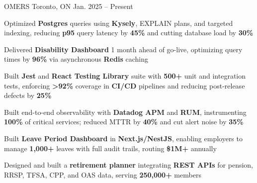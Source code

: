\documentclass[11pt, a4paper]{awesome-cv}
\begin{document}
\makecvheader[C]


\begin{cventries}


  \cventry
    {\color{lightblue}{ASSOCIATE FULL-STACK ENGINEER}}
    {OMERS}
    {Toronto, ON}
    {Jan. 2025 -- Present}
    {
      \begin{cvitems}
        \item{Optimized \textbf{Postgres} queries using \textbf{Kysely}, EXPLAIN plans, and targeted indexing, reducing \textbf{p95} query latency by \textbf{45\%} and cutting database load by \textbf{30\%}}
        \item{Delivered \textbf{Disability Dashboard} 1 month ahead of go-live, optimizing query times by \textbf{96\%} via asynchronous \textbf{Redis} caching}
        \item{Built \textbf{Jest} and \textbf{React Testing Library} suite with \textbf{500+} unit and integration tests, enforcing \textbf{>92\%} coverage in \textbf{CI/CD} pipelines and reducing post-release defects by \textbf{25\%}}
        \item{Built end-to-end observability with \textbf{Datadog APM} and \textbf{RUM}, instrumenting \textbf{100\%} of critical services; reduced MTTR by \textbf{40\%} and cut alert noise by \textbf{35\%}}
        \item{Built \textbf{Leave Period Dashboard} in \textbf{Next.js/NestJS}, enabling employers to manage \textbf{1,000+} leaves with full audit trails, routing \textbf{\$1M+} annually}
        \item{Designed and built a \textbf{retirement planner} integrating \textbf{REST APIs} for pension, RRSP, TFSA, CPP, and OAS data, serving \textbf{250,000+} members}
      \end{cvitems}
    }

  \vspace{3mm}


\end{cventries}
\end{document}
